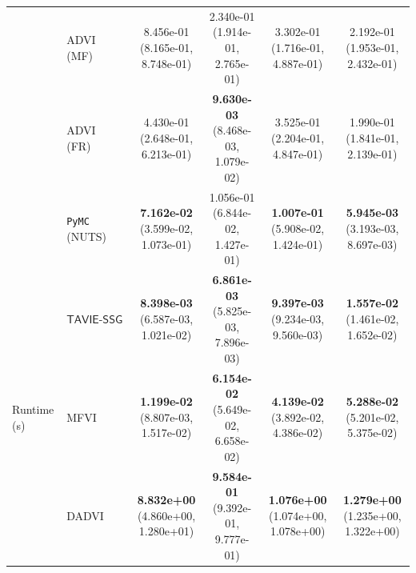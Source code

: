 \documentclass[12pt]{article}
\numberwithin{equation}{section}
\newcommand{\tssg}{\mathsf{TAVIE}\text{-}\mathsf{SSG}}
\begin{document}
{\begin{longtable}{llcccc}
& ADVI (MF)
& \makecell[c]{8.456e-01\\(8.165e-01, 8.748e-01)}
& \makecell[c]{2.340e-01\\(1.914e-01, 2.765e-01)}
& \makecell[c]{3.302e-01\\(1.716e-01, 4.887e-01)}
& \makecell[c]{2.192e-01\\(1.953e-01, 2.432e-01)} \\

& ADVI (FR)
& \makecell[c]{4.430e-01\\(2.648e-01, 6.213e-01)}
& \makecell[c]{\textbf{9.630e-03}\\(8.468e-03, 1.079e-02)}
& \makecell[c]{3.525e-01\\(2.204e-01, 4.847e-01)}
& \makecell[c]{1.990e-01\\(1.841e-01, 2.139e-01)} \\

& \texttt{PyMC} (NUTS)
& \makecell[c]{\textbf{7.162e-02}\\(3.599e-02, 1.073e-01)}
& \makecell[c]{1.056e-01\\(6.844e-02, 1.427e-01)}
& \makecell[c]{\textbf{1.007e-01}\\(5.908e-02, 1.424e-01)}
& \makecell[c]{\textbf{5.945e-03}\\(3.193e-03, 8.697e-03)} \\
\hline

\multirow{6}{*}{Runtime (s)}
& $\tssg$
& \makecell[c]{\textbf{8.398e-03}\\(6.587e-03, 1.021e-02)}
& \makecell[c]{\textbf{6.861e-03}\\(5.825e-03, 7.896e-03)}
& \makecell[c]{\textbf{9.397e-03}\\(9.234e-03, 9.560e-03)}
& \makecell[c]{\textbf{1.557e-02}\\(1.461e-02, 1.652e-02)} \\

& MFVI
& \makecell[c]{\textbf{1.199e-02}\\(8.807e-03, 1.517e-02)}
& \makecell[c]{\textbf{6.154e-02}\\(5.649e-02, 6.658e-02)}
& \makecell[c]{\textbf{4.139e-02}\\(3.892e-02, 4.386e-02)}
& \makecell[c]{\textbf{5.288e-02}\\(5.201e-02, 5.375e-02)} \\

& DADVI
& \makecell[c]{\textbf{8.832e+00}\\(4.860e+00, 1.280e+01)}
& \makecell[c]{\textbf{9.584e-01}\\(9.392e-01, 9.777e-01)}
& \makecell[c]{\textbf{1.076e+00}\\(1.074e+00, 1.078e+00)}
& \makecell[c]{\textbf{1.279e+00}\\(1.235e+00, 1.322e+00)} \\


\end{longtable}}
\end{document}
